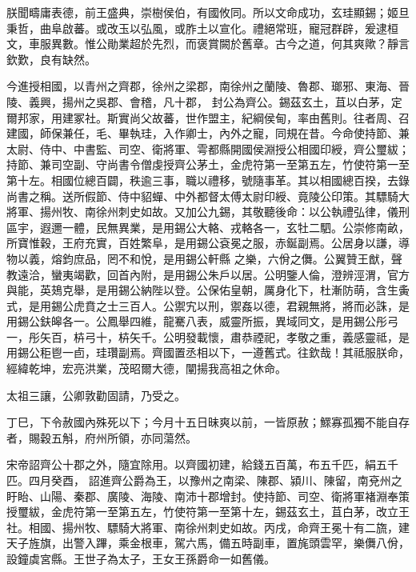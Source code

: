 \begin{pinyinscope}
 朕聞疇庸表德，前王盛典，崇樹侯伯，有國攸同。所以文命成功，玄珪顯錫；姬旦秉哲，曲阜啟蕃。或改玉以弘風，或胙土以宣化。禮絕常班，寵冠群辟，爰逮桓文，車服異數。惟公勛業超於先烈，而褒賞闕於舊章。古今之道，何其爽歟？靜言欽歎，良有缺然。



 今進授相國，以青州之齊郡，徐州之梁郡，南徐州之蘭陵、魯郡、瑯邪、東海、晉陵、義興，揚州之吳郡、會稽，凡十郡，
 封公為齊公。錫茲玄土，苴以白茅，定爾邦家，用建冢社。斯實尚父故蕃，世作盟主，紀綱侯甸，率由舊則。往者周、召建國，師保兼任，毛、畢執珪，入作卿士，內外之寵，同規在昔。今命使持節、兼太尉、侍中、中書監、司空、衛將軍、雩都縣開國侯淵授公相國印綬，齊公璽紱；持節、兼司空副、守尚書令僧虔授齊公茅土，金虎符第一至第五左，竹使符第一至第十左。相國位總百闢，秩逾三事，職以禮移，號隨事革。其以相國總百揆，去錄尚書之稱。送所假節、侍中貂蟬、中外都督太傅太尉印綬、竟陵公印策。其驃騎大將軍、揚州牧、南徐州刺史如故。又加公九錫，其敬聽後命：以公執禮弘律，儀刑區宇，遐邇一體，民無異業，是用錫公大輅、戎輅各一，玄牡二駟。公崇修南畝，所寶惟穀，王府充實，百姓繁阜，是用錫公袞冕之服，赤鋋副焉。公居身以謙，導物以義，熔鈞庶品，罔不和悅，是用錫公軒縣
 之樂，六佾之儛。公翼贊王猷，聲教遠洽，蠻夷竭歡，回首內附，是用錫公朱戶以居。公明鑒人倫，澄辨涇渭，官方與能，英鳷克舉，是用錫公納陛以登。公保佑皇朝，厲身化下，杜漸防萌，含生夤式，是用錫公虎賁之士三百人。公禦宄以刑，禦姦以德，君親無將，將而必誅，是用錫公鈇皞各一。公鳳舉四維，龍騫八表，威靈所振，異域同文，是用錫公彤弓一，彤矢百，枿弓十，枿矢千。公明發載懷，肅恭禋祀，孝敬之重，義感靈祗，是用錫公秬鬯一卣，珪瓚副焉。齊國置丞相以下，一遵舊式。往欽哉！其祗服朕命，經緯乾坤，宏亮洪業，茂昭爾大德，闡揚我高祖之休命。



 太祖三讓，公卿敦勸固請，乃受之。



 丁巳，下令赦國內殊死以下；今月十五日昧爽以前，一皆原赦；鰥寡孤獨不能自存者，賜穀五斛，府州所領，亦同蕩然。



 宋帝詔齊公十郡之外，隨宜除用。以齊國初建，給錢五百萬，布五千匹，絹五千匹。四月癸酉，
 詔進齊公爵為王，以豫州之南梁、陳郡、潁川、陳留，南兗州之盱眙、山陽、秦郡、廣陵、海陵、南沛十郡增封。使持節、司空、衛將軍褚淵奉策授璽紱，金虎符第一至第五左，竹使符第一至第十左，錫茲玄土，苴白茅，改立王社。相國、揚州牧、驃騎大將軍、南徐州刺史如故。丙戌，命齊王冕十有二旒，建天子旌旗，出警入蹕，乘金根車，駕六馬，備五時副車，置旄頭雲罕，樂儛八佾，設鐘虡宮縣。王世子為太子，王女王孫爵命一如舊儀。




\end{pinyinscope}
